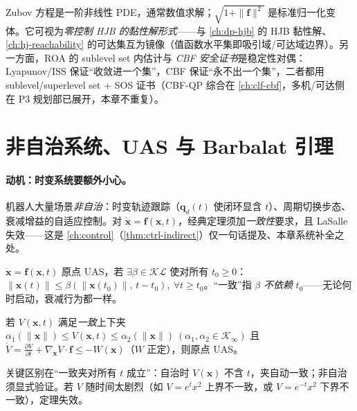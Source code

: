\begin{insight}
Zubov 方程是一阶非线性 PDE，通常数值求解；$\sqrt{1+\|\mathbf{f}\|^2}$ 是标准归一化变体。它可视为\emph{零控制 HJB 的黏性解形式}——与 \cref{ch:dp-hjb} 的 HJB 黏性解、\cref{ch:hj-reachability} 的可达集互为镜像（值函数水平集即吸引域/可达域边界）。另一方面，ROA 的 sublevel set 内估计与 \emph{CBF 安全证书}是稳定性对偶：Lyapunov/ISS 保证“收敛进一个集”，CBF 保证“永不出一个集”，二者都用 sublevel/superlevel set + SOS 证书（CBF-QP 综合在 \cref{ch:clf-cbf}，多机/可达侧在 P3 规划部已展开，本章不重复）。
\end{insight}

\section{非自治系统、UAS 与 Barbalat 引理}
\label{sec:lyap-nonauto}

\paragraph{动机：时变系统要额外小心。}
机器人大量场景\emph{非自治}：时变轨迹跟踪（$\mathbf{q}_d(t)$ 使闭环显含 $t$）、周期切换步态、衰减增益的自适应控制。对 $\dot{\mathbf{x}}=\mathbf{f}(\mathbf{x},t)$，经典定理须加\emph{一致性}要求，且 LaSalle 失效——这是 \cref{ch:control}（\cref{thm:ctrl-indirect}）仅一句话提及、本章系统补全之处。

\begin{definition}
\label{def:lyap-uas}
$\dot{\mathbf{x}}=\mathbf{f}(\mathbf{x},t)$ 原点 UAS，若 $\exists\beta\in\mathcal{KL}$ 使对所有 $t_0\ge0$：$\|\mathbf{x}(t)\|\le\beta(\|\mathbf{x}(t_0)\|,\,t-t_0),\ \forall t\ge t_0$。“一致”指 $\beta$ \emph{不依赖} $t_0$——无论何时启动，衰减行为都一样。
\end{definition}

\begin{theorem}
\label{thm:lyap-nonauto}
若 $V(\mathbf{x},t)$ 满足\emph{一致}上下夹 $\alpha_1(\|\mathbf{x}\|)\le V(\mathbf{x},t)\le\alpha_2(\|\mathbf{x}\|)\ (\alpha_1,\alpha_2\in\mathcal{K}_\infty)$ 且 $\dot V=\frac{\partial V}{\partial t}+\nabla_{\mathbf{x}}V\cdot\mathbf{f}\le-W(\mathbf{x})$（$W$ 正定），则原点 UAS。
\end{theorem}

\noindent 关键区别在“一致夹对所有 $t$ 成立”：自治时 $V(\mathbf{x})$ 不含 $t$，夹自动一致；非自治须显式验证。若 $V$ 随时间太剧烈（如 $V=e^tx^2$ 上界不一致，或 $V=e^{-t}x^2$ 下界不一致），定理失效。

